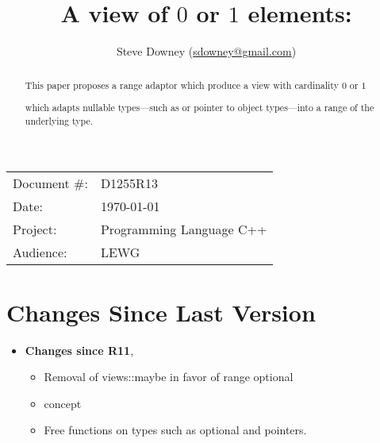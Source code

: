 \documentclass[a4paper,10pt,oneside,openany,final,article]{memoir}
\begin{document}
\title{A view of $0$ or $1$ elements: }
\author{
Steve Downey \small(\href{mailto:sdowney@gmail.com}{sdowney@gmail.com}) \\
}
\date{} %
\maketitle

\begin{flushright}
\begin{tabular}{ll}
  Document \#: & D1255R13 \\
  Date: & \today \\
  Project: & Programming Language C++ \\
  Audience: & LEWG
\end{tabular}
\end{flushright}

\begin{abstract}
  This paper proposes a range adaptor which produce a view with cardinality $0$ or $1$

   which adapts nullable types---such as  or pointer to object types---into a range of the underlying type.
\end{abstract}

\tableofcontents*

\chapter*{Changes Since Last Version}

\begin{itemize}
\item \textbf{Changes since R11},
  \begin{itemize}
  \item Removal of views::maybe in favor of range optional
  \item {} concept
  \item Free functions on  types such as optional and pointers.
  \end{itemize}
\end{itemize}
\end{document}
